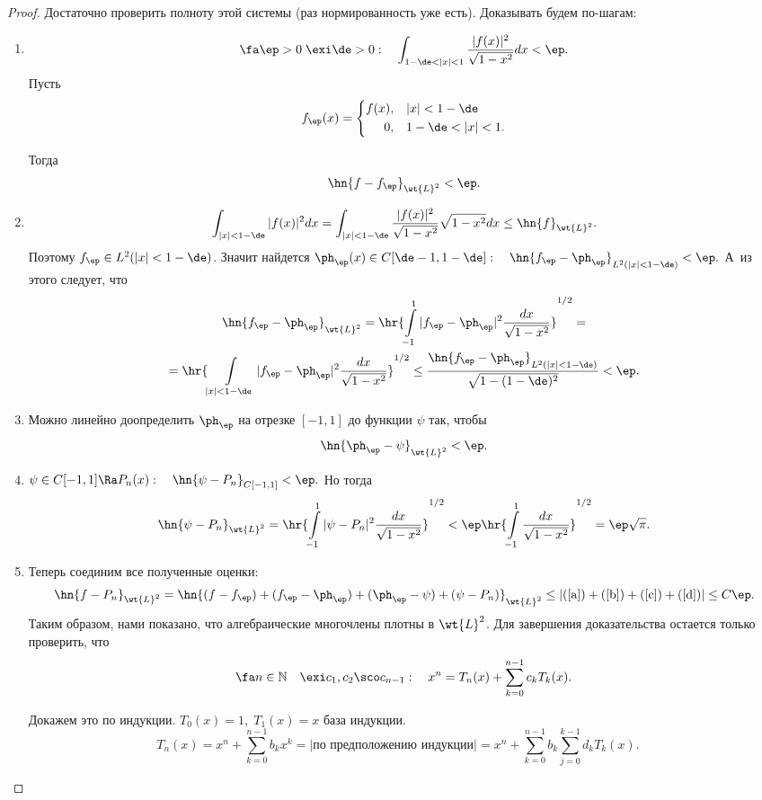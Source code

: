 \documentclass[a4paper]{article}
\begin{document}
\begin{proof}
  Достаточно проверить полноту этой системы
  (раз нормированность уже есть). Доказывать будем по-шагам:
  \begin{enumerate}
  \item
    $$\fa\ep>0\;\exi\de>0:\quad\int_{1-\de<|x|<1}\frac{|f(x)|^2}{\sqrt{1-x^2}}dx<\ep.$$
    Пусть
    $$f_{\ep}(x)=\left\{\begin{aligned}f(x),&\quad|x|<1-\de\\
    0,&\quad1-\de<|x|<1.\end{aligned}\right.$$

    Тогда
    \begin{equation}\label{a}
      \hn{f-f_{\ep}}_{\wt{L}^2}<\ep.
    \end{equation}
  \item
    $$\int_{|x|<1-\de}|f(x)|^2dx=\int_{|x|<1-\de}\frac{|f(x)|^2}{\sqrt{1-x^2}}\sqrt{1-x^2}dx\le\hn{f}_{\wt{L}^2}.$$
    Поэтому $f_{\ep}\in L^2(|x|<1-\de)$. Значит найдется $\ph_{\ep}(x)\in
    C[\de-1,1-\de]:\quad\hn{f_{\ep}-\ph_{\ep}}_{L^2(|x|<1-\de)}<\ep.$ А~из этого
    следует, что
    \begin{multline}\label{b}
      \hn{f_{\ep}-\ph_{\ep}}_{\wt{L}^2}=\hr{\int\limits_{-1}^1|f_{\ep}-\ph_{\ep}|^2\frac{dx}{\sqrt{1-x^2}}}^{1/2}=\\
      =\hr{\int\limits_{|x|<1-\de}|f_{\ep}-\ph_{\ep}|^2\frac{dx}{\sqrt{1-x^2}}}^{1/2}\le\frac{\hn{f_{\ep}-\ph_{\ep}}_{L^2(|x|<1-\de)}}{\sqrt{1-(1-\de)^2}}<\ep.
    \end{multline}

  \item
    Можно линейно доопределить $\ph_{\ep}$ на отрезке
    $[-1,1]$ до функции $\psi$ так, чтобы
    \begin{equation}\label{c}
      \hn{\ph_{\ep}-\psi}_{\wt{L}^2}<\ep.
    \end{equation}
  \item
    $\psi\in C[-1,1]\Ra P_n(x):\quad
    \hn{\psi-P_n}_{C[-1,1]}<\ep.$ Но тогда
    \begin{equation}\label{d}
      \hn{\psi-P_n}_{\wt{L}^2}=\hr{\int\limits_{-1}^1|\psi-P_n|^2\frac{dx}{\sqrt{1-x^2}}}^{1/2}<\ep\hr{\int\limits_{-1}^1\frac{dx}{\sqrt{1-x^2}}}^{1/2}=\ep\sqrt{\pi}.
    \end{equation}
  \item
    Теперь соединим все полученные оценки:
    $$\hn{f-P_n}_{\wt{L}^2}=\hn{(f-f_{\ep})+(f_{\ep}-\ph_{\ep})+(\ph_{\ep}-\psi)+(\psi-P_n)}_{\wt{L}^2}\le|(\ref{a})+(\ref{b})+(\ref{c})+(\ref{d})|\le C\ep.$$
    Таким образом, нами показано, что алгебраические многочлены плотны
    в $\wt{L}^2$. Для завершения доказательства остается только
    проверить, что
    $$\fa n\in\mathbb{N}\quad\exi
    c_1,c_2\sco c_{n-1}:\quad
    x^n=T_n(x)+\sum_{k=0}^{n-1}c_kT_k(x).$$

    Докажем это по индукции. $T_0(x)=1,\;T_1(x)=x$ база индукции.
    $$T_n(x)=x^n+\sum_{k=0}^{n-1}b_kx^k=|\text{по предположению индукции}|=x^n+\sum_{k=0}^{n-1}b_k\sum_{j=0}^{k-1}d_kT_k(x).\quad$$

  \end{enumerate}
\end{proof}
\end{document}
